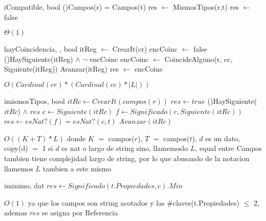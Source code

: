 \begin{Algoritmos}
  \begin{algoritmo}{iCompatible}{, }{bool}
    \eIf(){Campos(r) = Campos(t)}{
    	res $\leftarrow$ MismosTipos(r,t) 
    }{
    	res $\leftarrow$ false 
    }
  \end{algoritmo}
  \datosAlgoritmo{} %
  {} %
  {} %
  {$\Theta(1)$} %
  {} %

  \begin{algoritmo}{hayCoincidencia}{, , }{bool}
  itReg $\leftarrow$ CrearIt(cr) 
  encCoinc $\leftarrow$ false 
  \While(){HaySiguiente(itReg) $\wedge$ $\neg$ encCoinc}{
  	encCoinc $\leftarrow$ CoincideAlguno(r, cc, Siguiente(itReg)) 
    Avanzar(itReg) 
  }
    res $\leftarrow$ encCoinc
  \end{algoritmo}
  \datosAlgoritmo{} %
  {} %
  {} %
  {$O(Cardinal(cr) * (Cardinal(cc) * |L|))$} %
  {} %

  \begin{algoritmo}{imismosTipos}{, }{bool}
  $itRc \gets CrearIt(campos(r))$ 
  $res \gets true $ 
  \While(){HaySiguiente($itRc$) $\land$ $res$}{
  	$c \gets Siguiente(itRc) $ 
  	$f \gets Significado(r,Siguiente(itRc)) $ 
  	$res \gets esNat?(f) = esNat?(c,t)$   
  	$Avanzar(itRc) $ 
  }
  \end{algoritmo}
  \datosAlgoritmo{} %
  {} %
  {} %
  {$O((K + T) * L)$} %
  {donde $K$ $=$ campos($r$), $T$ $=$ campos($t$), $d$ es un dato, copy(d) $=$ 1 si $d$ es nat o largo de string sino, llamemoslo $L$, equal entre Campos tambien tiene complejidad largo de string, por lo que abusando de la notacion llamemos $L$ tambien a este mismo} %

  \begin{algoritmo}{iminimo}{, }{dat}
  	$res \gets Significado(t.Propiedades,c).Min$ 
  \end{algoritmo}
  \datosAlgoritmo{} %
  {} %
  {} %
  {$ O(1)$} %
  {ya que los campos son string acotados y las $\#$claves(t.Propiedades) $\leq$ 2, ademas $res$ se asigna por Referencia } %


\end{Algoritmos}
